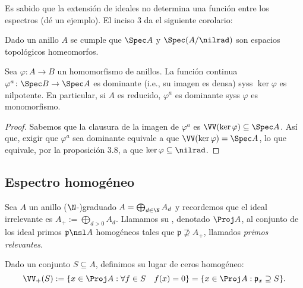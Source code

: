 Es sabido que la extensión de ideales no determina una función entre los espectros (dé un ejemplo).
El inciso 3 da el siguiente corolario:
\begin{cor}
	Dado un anillo $A$ se cumple que $\Spec A$ y $\Spec(A/\nilrad)$ son espacios topológicos homeomorfos.
\end{cor}
\begin{cor}
	Sea $\varphi \colon A \to B$ un homomorfismo de anillos.
	La función continua $\varphi^a \colon \Spec B \to \Spec A$ es dominante (i.e., su imagen es densa) syss $\ker \varphi$ es nilpotente.
	En particular, si $A$ es reducido, $\varphi^a$ es dominante syss $\varphi$ es monomorfismo.
\end{cor}
\begin{proof}
	Sabemos que la clausura de la imagen de $\varphi^a$ es $\VV(\ker \varphi) \subseteq \Spec A$.
	Así que, exigir que $\varphi^a$ sea dominante equivale a que $\VV(\ker\varphi) = \Spec A$, lo que equivale, por la proposición 3.8,
	a que $\ker\varphi \subseteq \nilrad$.
\end{proof}

\subsection{Espectro homogéneo}
\begin{mydef}
	Sea $A$ un anillo ($\N$-)graduado $A = \bigoplus_{d\in\N} A_d$ y recordemos que el ideal irrelevante es $A_+ := \bigoplus_{d > 0} A_d$.
	Llamamos su , denotado $\Proj A$, al conjunto de los ideal primos $\mathfrak{p} \nsl A$
	homogéneos tales que $\mathfrak{p} \nsupseteq A_+$, llamados \textit{primos relevantes}.

	Dado un conjunto $S \subseteq A$, definimos su lugar de ceros homogéneo:
	$$ \VV_+(S) := \{ x \in \Proj A : \forall f \in S \quad f (x) = 0 \} = \{ x \in \Proj A : \mathfrak{p}_x \supseteq S \}. $$
\end{mydef}

